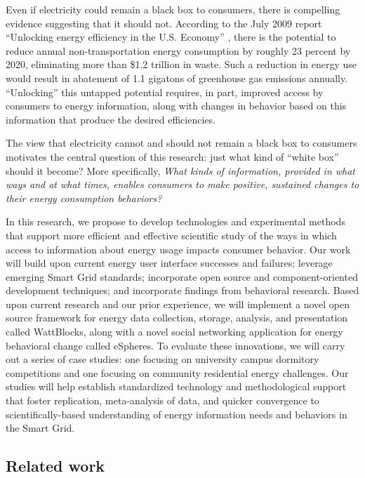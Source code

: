Even if electricity could remain a black box to consumers, there is
compelling evidence suggesting that it should not.  According to the July
2009 report ``Unlocking energy efficiency in the U.S. Economy''
\cite{Granade09}, there is the potential to reduce annual
non-transportation energy consumption by roughly 23 percent by 2020,
eliminating more than \$1.2 trillion in waste.  Such a reduction in energy
use would result in abatement of 1.1 gigatons of greenhouse gas emissions
annually. ``Unlocking'' this untapped potential requires, in part, improved
access by consumers to energy information, along with changes in behavior
based on this information that produce the desired efficiencies.

The view that electricity cannot and should not remain a black box to
consumers motivates the central question of this research: just what kind of
``white box'' should it become?  More specifically, {\em What kinds of
  information, provided in what ways and at what times, enables consumers
  to make positive, sustained changes to their energy consumption
  behaviors?}

In this research, we propose to develop technologies and experimental
methods that support more efficient and effective scientific study of the
ways in which access to information about energy usage impacts consumer
behavior.  Our work will build upon current energy user interface successes
and failures; leverage emerging Smart Grid standards; incorporate open
source and component-oriented development techniques; and incorporate findings
from behavioral research. Based upon current research and our prior
experience, we will implement a novel open source framework for energy data
collection, storage, analysis, and presentation called WattBlocks, along
with a novel social networking application for energy behavioral change
called eSpheres.  To evaluate these innovations, we will carry out a series of case studies:
one focusing on university campus dormitory competitions and one focusing
on community residential energy challenges. Our studies will help establish standardized technology
and methodological support that foster replication, meta-analysis of data,
and quicker convergence to scientifically-based understanding of energy
information needs and behaviors in the Smart Grid.

\subsection{Related work}
\label{sec:related-work}

